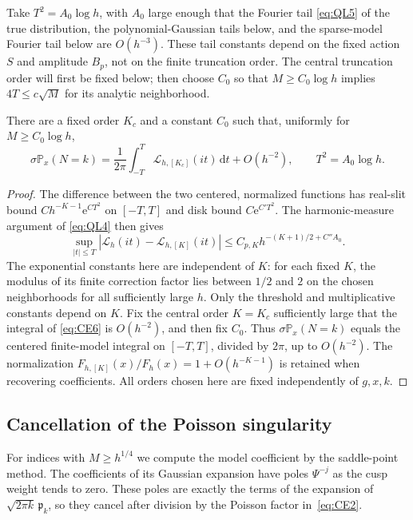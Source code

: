 Take $T^2=A_0\log h$, with $A_0$ large enough that the Fourier
tail \eqref{eq:QL5} of the true distribution, the polynomial-Gaussian tails below, and the
sparse-model Fourier tail below are $O(h^{-3})$. These tail
constants depend on the fixed action $S$ and amplitude $B_p$, not
on the finite truncation order.
The central truncation order will first be fixed below; then choose $C_0$
so that $M\ge C_0\log h$ implies $4T\le c\sqrt M$ for its
analytic neighborhood.

\begin{lemma}\label{lem:local-comparison}
There are a fixed order $K_c$ and a constant $C_0$ such that, uniformly
for $M\ge C_0\log h$,
\[
 \sigma\mathbb P_x(N=k)=\frac1{2\pi}\int_{-T}^{T}\mathcal L_{h,[K_c]}(it)\,\mathrm dt
 +O(h^{-2}),\qquad T^2=A_0\log h.
\]
\end{lemma}

\begin{proof}
The difference between the two centered, normalized functions has real-slit bound
$C h^{-K-1}\mathrm{e}^{CT^2}$ on $[-T,T]$ and disk bound $C\mathrm{e}^{C'T^2}$.
The harmonic-measure argument of \eqref{eq:QL4} then gives
\begin{equation}
 \sup_{|t|\le T}|\mathcal L_h(it)-\mathcal L_{h,[K]}(it)|
       \le C_{p,K}h^{-(K+1)/2+C''A_0}.
 \label{eq:CE6}
\end{equation}
The exponential constants here are independent of $K$: for each fixed
$K$, the modulus of its finite correction factor lies between $1/2$ and $2$ on the
chosen neighborhoods for all sufficiently large $h$. Only the threshold
and multiplicative constants depend on $K$. Fix the central order $K=K_c$ sufficiently large
that the integral of \eqref{eq:CE6} is $O(h^{-2})$, and then fix $C_0$.
Thus $\sigma\mathbb P_x(N=k)$ equals the centered finite-model integral
on $[-T,T]$, divided by $2\pi$, up to $O(h^{-2})$.
The normalization $F_{h,[K]}(x)/F_h(x)=1+O(h^{-K-1})$ is retained
when recovering coefficients. All orders chosen here are fixed
independently of $g,x,k$.
\end{proof}

\subsection{Cancellation of the Poisson singularity}

For indices with $M\ge h^{1/4}$ we compute the model coefficient by the
saddle-point method. The coefficients of its Gaussian expansion have poles
$\Psi^{-j}$ as the cusp weight tends to zero. These poles are exactly the
terms of the expansion of $\sqrt{2\pi k}\,\mathfrak p_k$, so they cancel after
division by the Poisson factor in~\eqref{eq:CE2}.

